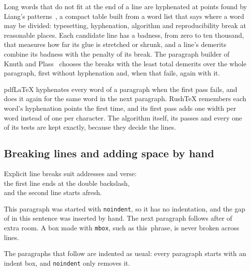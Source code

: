 \documentclass{article}
\numberwithin{equation}{section}
\theoremstyle{definition}
\theoremstyle{remark}
\begin{document}
Long words that do not fit at the end of a line are hyphenated at points found by
Liang's patterns~\cite{liang83}, a compact table built from a word list that says where
a word may be divided: typesetting, hyphenation, algorithm and reproducibility break at
reasonable places. Each candidate line has a badness, from zero to ten thousand, that
measures how far its glue is stretched or shrunk, and a line's demerits combine its
badness with the penalty of its break. The paragraph builder of Knuth and
Plass~\cite{knuth81} chooses the breaks with the least total demerits over the whole
paragraph, first without hyphenation and, when that fails, again with it.

pdfLaTeX hyphenates every word of a paragraph when the first pass fails, and does it
again for the same word in the next paragraph. RushTeX remembers each word's
hyphenation points the first time, and its first pass adds one width per word instead of
one per character. The algorithm itself, its passes and every one of its tests are kept
exactly, because they decide the lines.

\subsection{Breaking lines and adding space by hand}

Explicit line breaks suit addresses and verse:\\
the first line ends at the double backslash,\\
and the second line starts afresh.

\noindent This paragraph was started with \texttt{noindent}, so it has no indentation,
and the gap of \hspace{1em} in this sentence was inserted by hand. The next paragraph
follows after \vspace{6pt} of extra room. A box made with \texttt{mbox}, such as
\mbox{this phrase}, is never broken across lines.

The paragraphs that follow are indented as usual: every paragraph starts with an indent
box, and \texttt{noindent} only removes it.
\end{document}
